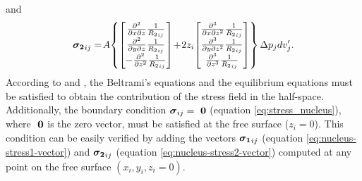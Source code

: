 \documentclass[P]{BrJG_submit}
\begin{document}
and 
\begin{equation}
\mbox{\boldmath$\sigma_{2}$}_{ij} = \! 
A  \! 
\left\{
\begin{bmatrix} 
\frac{\partial^{2}  }{\partial x \partial z} {\frac{1}{{R_2}_{ij}}} \\
\frac{\partial^{2} }{\partial y \partial z} {\frac{1}{{R_2}_{ij}}} \\
- \frac{\partial^{2} }{\partial z^{2}} {\frac{1}{{R_2}_{ij}}}   
\end{bmatrix}
\! + \! 2 z_{i} \! 
\begin{bmatrix} 
\frac{\partial^{3}  }{\partial x \partial z^{2}} {\frac{1}{{R_2}_{ij}}} \\
\frac{\partial^{3} }{\partial y \partial z^{2}} {\frac{1}{{R_2}_{ij}}} \\
\frac{\partial^{3} }{\partial z^{3}} {\frac{1}{{R_2}_{ij}}} 
\end{bmatrix}
\right\}
\Delta p_{j}dv_j^{\prime}.
\label{eq:nucleus-stress2-vector}
\end{equation}
According to \cite{Sharma56} and \cite{Tempone10}, the Beltrami’s equations \citep{Beltrami} and the equilibrium equations must be satisfied to obtain the contribution of the stress field in the half-space. 
Additionally, the boundary condition 
$\mbox{\boldmath$\sigma$}_{ij} = \mbox{ \boldmath$0$}$ (equation \ref{eq:stress_nucleus}), where $\mbox{ \boldmath$0$}$ is the zero vector, must be satisfied at the free surface ($z_i = 0$).
This condition can be easily verified by adding the vectors 
$\mbox{\boldmath$\sigma_{1}$}_{ij}$ (equation \ref{eq:nucleus-stress1-vector}) and 
$\mbox{\boldmath$\sigma_{2}$}_{ij}$ (equation \ref{eq:nucleus-stress2-vector}) 
computed at any point on the free surface $(x_i, y_i, z_i = 0)$.
\end{document}
